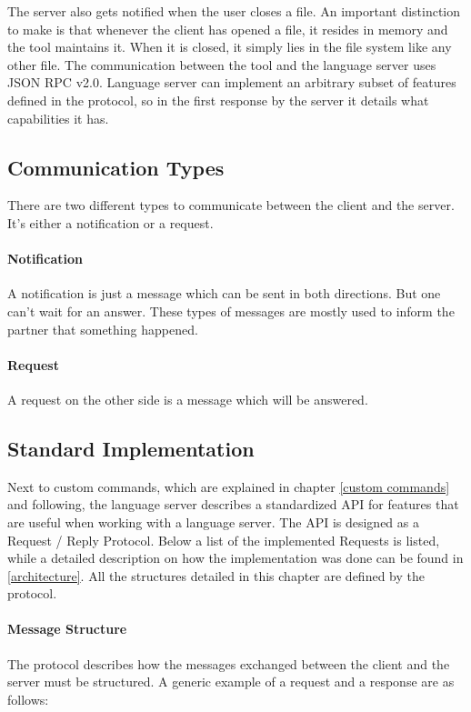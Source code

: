The server also gets notified when the user closes a file. An important distinction to make is that whenever the client has opened a file, it resides in memory and the tool maintains it. When it is closed, it simply lies in the file system like any other file. \newline
The communication between the tool and the language server uses JSON RPC v2.0. Language server can implement an arbitrary subset of features defined in the protocol, so in the first response by the server it details what capabilities it has. \newline


\subsection{Communication Types}
There are two different types to communicate between the client and the server. It's either a notification or a request. 

\paragraph{Notification}
A notification is just a message which can be sent in both directions. But one can't wait for an answer. These types of messages are mostly used to inform the partner that something happened. 

\paragraph{Request}
A request on the other side is a message which will be answered.  

\subsection{Standard Implementation}
Next to custom commands, which are explained in chapter \ref{custom commands} and following, the language server describes a standardized API\cite{protMaster} for features that are useful when working with a language server. The API is designed as a Request / Reply Protocol. Below a list of the implemented Requests is listed, while a detailed description on how the implementation was done can be found in \ref{architecture}. All the structures detailed in this chapter are defined by the protocol. \newline

\paragraph{Message Structure}
The protocol describes how the messages exchanged between the client and the server must be structured. A generic example of a request and a response are as follows:

